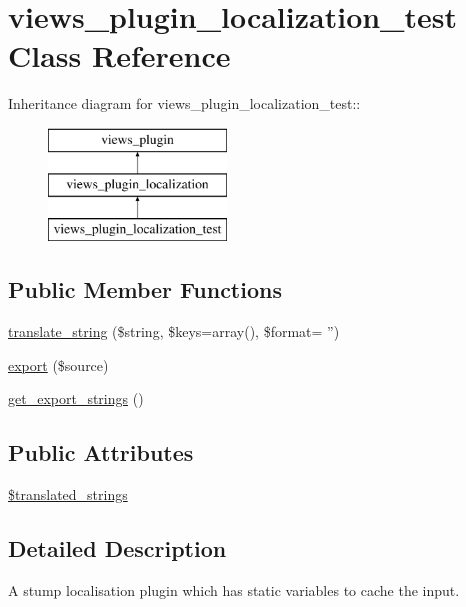 \hypertarget{classviews__plugin__localization__test}{
\section{views\_\-plugin\_\-localization\_\-test Class Reference}
\label{classviews__plugin__localization__test}
}
Inheritance diagram for views\_\-plugin\_\-localization\_\-test::\begin{figure}[H]
\begin{center}
\leavevmode
\includegraphics[height=3cm]{classviews__plugin__localization__test}
\end{center}
\end{figure}
\subsection*{Public Member Functions}
\begin{DoxyCompactItemize}
\item 
\hyperlink{classviews__plugin__localization__test_a0b8d7823ac389e461a0cbe95488254d5}{translate\_\-string} (\$string, \$keys=array(), \$format= '')
\item 
\hyperlink{classviews__plugin__localization__test_a1740df329ba25cb81db1cf1a92be9ed8}{export} (\$source)
\item 
\hyperlink{classviews__plugin__localization__test_ae6645d5f7cd47349668c3bf504914407}{get\_\-export\_\-strings} ()
\end{DoxyCompactItemize}
\subsection*{Public Attributes}
\begin{DoxyCompactItemize}
\item 
\hyperlink{classviews__plugin__localization__test_a5d2bdbe2516d31dba8f59354562bce4a}{\$translated\_\-strings}
\end{DoxyCompactItemize}


\subsection{Detailed Description}
A stump localisation plugin which has static variables to cache the input. 

